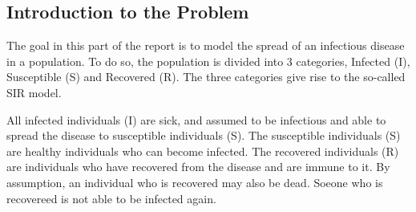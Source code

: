\subsection{Introduction to the Problem}

The goal in this part of the report is to model the spread of an
infectious disease in a population. To do so, the population is
divided into 3 categories, Infected (I), Susceptible (S) and
Recovered (R). The three categories give rise to the
so-called SIR model.

All infected  individuals (I) are sick, and assumed to be infectious
and able to spread the disease to susceptible individuals (S). The
susceptible individuals (S) are healthy individuals who can become
infected. The recovered individuals (R) are individuals who have
recovered from the disease and are immune to it. By assumption, 
an individual who is recovered may also be dead. Soeone who is
recovereed is not able to be infected again.